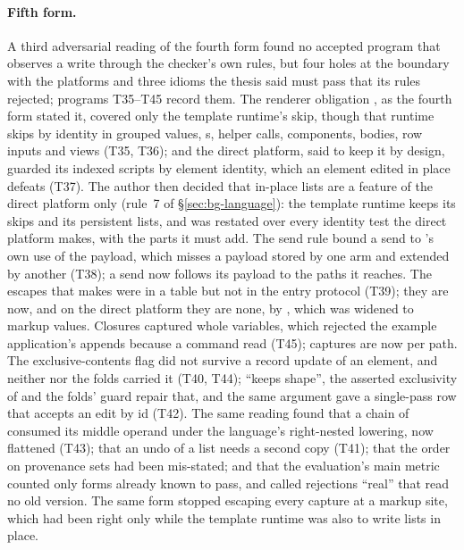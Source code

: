 \paragraph{Fifth form.} A third adversarial reading of the fourth form found no accepted program that
observes a write through the checker's own rules, but four holes at the boundary with the platforms and
three idioms the thesis said must pass that its rules rejected; programs T35--T45 record them. The
renderer obligation , as the fourth form stated it, covered only the template runtime's
 skip, though that runtime skips by identity in grouped values, s, helper calls,
components,  bodies, row inputs and views (T35, T36); and the direct platform, said to keep it by
design, guarded its indexed scripts by element identity, which an element edited in place defeats (T37).
The author then decided that in-place lists are a feature of the direct platform only (rule~7 of
\S\ref{sec:bg-language}): the template runtime keeps its skips and its persistent lists, and  was
restated over every identity test the direct platform makes, with the parts it must add. The send rule bound
a send to 's own use of the payload, which misses a payload stored by one arm and extended by
another (T38); a send now follows its payload to the paths it reaches. The escapes that  makes
were in a table but not in the entry protocol (T39); they are now, and on the direct platform they are none,
by , which was widened to markup values. Closures captured whole variables, which rejected the
example application's appends because a command read  (T45); captures are now per path.
The exclusive-contents flag did not survive a record update of an element, and neither 
nor the folds carried it (T40, T44); ``keeps shape'', the asserted exclusivity of  and the
folds' guard repair that, and the same argument gave  a single-pass row that accepts an edit by id
(T42). The same reading found that a chain of \code{++} consumed its middle operand under the language's
right-nested lowering, now flattened (T43); that an undo of a list needs a second copy (T41); that the order
on provenance sets had been mis-stated; and that the evaluation's main metric counted only forms already
known to pass, and called rejections ``real'' that read no old version.
The same form stopped escaping every capture at a markup site, which had been right only while the
template runtime was also to write lists in place.

